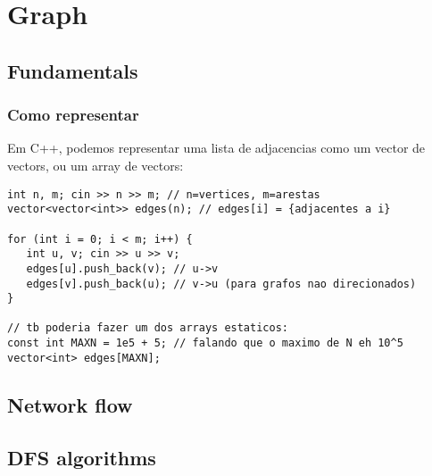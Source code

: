 \chapter{Graph}

\section{Fundamentals}

\subsection{Como representar}

Em C++, podemos representar uma lista de adjacencias como um vector de vectors, ou um array de vectors:
\begin{lstlisting}
int n, m; cin >> n >> m; // n=vertices, m=arestas
vector<vector<int>> edges(n); // edges[i] = {adjacentes a i}

for (int i = 0; i < m; i++) {
   int u, v; cin >> u >> v;
   edges[u].push_back(v); // u->v
   edges[v].push_back(u); // v->u (para grafos nao direcionados)
}

// tb poderia fazer um dos arrays estaticos:
const int MAXN = 1e5 + 5; // falando que o maximo de N eh 10^5
vector<int> edges[MAXN];
\end{lstlisting}


\section{Network flow}


\section{DFS algorithms}

